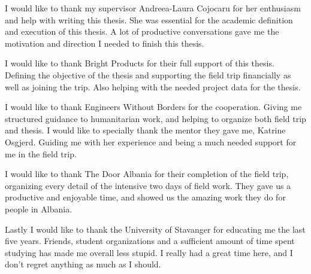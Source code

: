 
\acknowledgements

I would like to thank my supervisor Andreea-Laura Cojocaru for her enthusiasm and help with writing this thesis. She was essential for the academic definition and execution of this thesis. A lot of productive conversations gave me the motivation and direction I needed to finish this thesis. 

I would like to thank Bright Products for their full support of this thesis. Defining the objective of the thesis and supporting the field trip financially as well as joining the trip. Also helping with the needed project data for the thesis. 

I would like to thank Engineers Without Borders for the cooperation. Giving me structured guidance to humanitarian work, and helping to organize both field trip and thesis. I would like to specially thank the mentor they gave me, Katrine Osgjerd. Guiding me with her experience and being a much needed support for me in the field trip. 

I would like to thank The Door Albania for their completion of the field trip, organizing every detail of the intensive two days of field work. They gave us a productive and enjoyable time, and showed us the amazing work they do for people in Albania.

Lastly I would like to thank the University of Stavanger for educating me the last five years. Friends, student organizations and a sufficient amount of time spent studying has made me overall less stupid. I really had a great time here, and I don't regret anything as much as I should. 